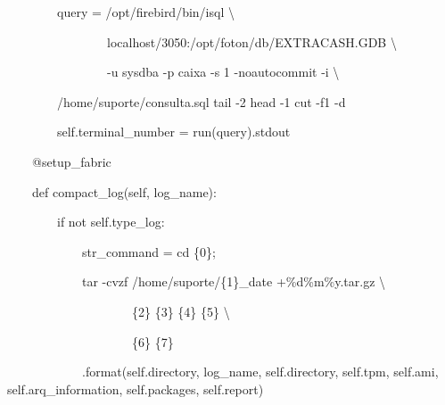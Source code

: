     \bigskip

{\ttfamily\color[rgb]{0.10980392,0.10980392,0.10980392}
    \ \ \ \ \ \ \ \ query = {\textquotedbl}{\textquotedbl}{\textquotedbl}/opt/firebird/bin/isql {\textbackslash}}

{\ttfamily\color[rgb]{0.10980392,0.10980392,0.10980392}
    \ \ \ \ \ \ \ \ \ \ \ \ \ \ \ \ localhost/3050:/opt/foton/db/EXTRACASH.GDB {\textbackslash}}

{\ttfamily\color[rgb]{0.10980392,0.10980392,0.10980392}
    \ \ \ \ \ \ \ \ \ \ \ \ \ \ \ \ {}-u sysdba -p caixa -s 1 -noautocommit -i {\textbackslash}}

{\ttfamily\color[rgb]{0.10980392,0.10980392,0.10980392}
    \ \ \ \ \ \ \ \ /home/suporte/consulta.sql {\textbar} tail -2 {\textbar}head -1 {\textbar} cut -f1 -d{\textquotedbl}
    {\textquotedbl} {\textquotedbl}{\textquotedbl}{\textquotedbl}}

{\ttfamily\color[rgb]{0.10980392,0.10980392,0.10980392}
    \ \ \ \ \ \ \ \ self.terminal\_number = run(query).stdout}


    \bigskip

{\ttfamily\color[rgb]{0.10980392,0.10980392,0.10980392}
    \ \ \ \ @setup\_fabric}

{\ttfamily\color[rgb]{0.10980392,0.10980392,0.10980392}
    \ \ \ \ def compact\_log(self, log\_name):}

{\ttfamily\color[rgb]{0.10980392,0.10980392,0.10980392}
    \ \ \ \ \ \ \ \ if not self.type\_log:}

{\ttfamily\color[rgb]{0.10980392,0.10980392,0.10980392}
    \ \ \ \ \ \ \ \ \ \ \ \ str\_command = {\textquotedbl}{\textquotedbl}{\textquotedbl}cd \{0\};}

{\ttfamily\color[rgb]{0.10980392,0.10980392,0.10980392}
    \ \ \ \ \ \ \ \ \ \ \ \ tar -cvzf /home/suporte/\{1\}\_{\textasciigrave}date +\%d\%m\%y{\textasciigrave}.tar.gz
    {\textbackslash}}

{\ttfamily\color[rgb]{0.10980392,0.10980392,0.10980392}
    \ \ \ \ \ \ \ \ \ \ \ \ \ \ \ \ \ \ \ \ \{2\} \{3\} \{4\} \{5\} {\textbackslash}}

{\ttfamily\color[rgb]{0.10980392,0.10980392,0.10980392}
    \ \ \ \ \ \ \ \ \ \ \ \ \ \ \ \ \ \ \ \ \{6\} \{7\}}

{\ttfamily\color[rgb]{0.10980392,0.10980392,0.10980392}
    \ \ \ \ \ \ \ \ \ \ \ \ {\textquotedbl}{\textquotedbl}{\textquotedbl}.format(self.directory, log\_name, self.directory,
            self.tpm, self.ami, self.arq\_information, self.packages, self.report)}

